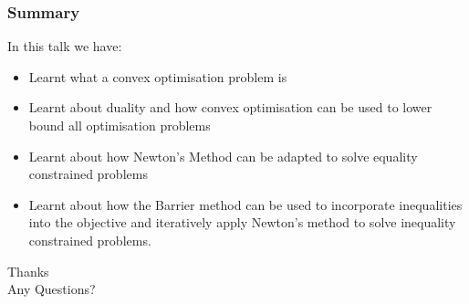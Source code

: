 \documentclass{beamer}
\def\rnum{\mathbb{R}}
\begin{document}
\begin{frame}
    \frametitle{Summary}
    In this talk we have:
    \begin{itemize}
        \item Learnt what a convex optimisation problem is
        \item Learnt about duality and how convex optimisation can be used to lower bound all
            optimisation problems
        \item Learnt about how Newton's Method can be adapted to solve equality
            constrained problems
        \item Learnt about how the Barrier method can be used to incorporate
            inequalities into the objective and iteratively apply Newton's
            method to solve inequality constrained problems.
    \end{itemize}
\end{frame}

\begin{frame}
    \centering
    Thanks \\
    Any Questions?
\end{frame}

\end{document}
